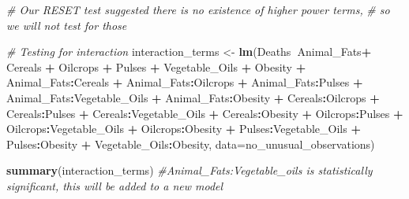 \documentclass[
]{article}
\newenvironment{Shaded}{\begin{snugshade}}{\end{snugshade}}
\newcommand{\CommentTok}[1]{\textcolor[rgb]{0.56,0.35,0.01}{\textit{#1}}}
\newcommand{\DataTypeTok}[1]{\textcolor[rgb]{0.13,0.29,0.53}{#1}}
\newcommand{\KeywordTok}[1]{\textcolor[rgb]{0.13,0.29,0.53}{\textbf{#1}}}
\newcommand{\NormalTok}[1]{#1}
\newcommand{\OperatorTok}[1]{\textcolor[rgb]{0.81,0.36,0.00}{\textbf{#1}}}
\newcommand{\StringTok}[1]{\textcolor[rgb]{0.31,0.60,0.02}{#1}}
\begin{document}
\begin{Shaded}
\begin{Highlighting}[]
\CommentTok{# Our RESET test suggested there is no existence of higher power terms,}
\CommentTok{# so we will not test for those}

\CommentTok{# Testing for interaction}
\NormalTok{interaction_terms <-}\StringTok{ }\KeywordTok{lm}\NormalTok{(Deaths}\OperatorTok{~}\NormalTok{Animal_Fats}\OperatorTok{+}\StringTok{ }\NormalTok{Cereals }\OperatorTok{+}\StringTok{ }\NormalTok{Oilcrops }\OperatorTok{+}\StringTok{ }\NormalTok{Pulses }\OperatorTok{+}\StringTok{ }
\StringTok{  }\NormalTok{Vegetable_Oils }\OperatorTok{+}\StringTok{ }\NormalTok{Obesity }\OperatorTok{+}\StringTok{ }\NormalTok{Animal_Fats}\OperatorTok{:}\NormalTok{Cereals }\OperatorTok{+}\StringTok{ }\NormalTok{Animal_Fats}\OperatorTok{:}\NormalTok{Oilcrops }\OperatorTok{+}
\StringTok{    }\NormalTok{Animal_Fats}\OperatorTok{:}\NormalTok{Pulses }\OperatorTok{+}\StringTok{ }\NormalTok{Animal_Fats}\OperatorTok{:}\NormalTok{Vegetable_Oils }\OperatorTok{+}\StringTok{ }\NormalTok{Animal_Fats}\OperatorTok{:}\NormalTok{Obesity }\OperatorTok{+}\StringTok{ }
\StringTok{    }\NormalTok{Cereals}\OperatorTok{:}\NormalTok{Oilcrops }\OperatorTok{+}\StringTok{ }\NormalTok{Cereals}\OperatorTok{:}\NormalTok{Pulses }\OperatorTok{+}\StringTok{ }
\StringTok{    }\NormalTok{Cereals}\OperatorTok{:}\NormalTok{Vegetable_Oils }\OperatorTok{+}\StringTok{ }\NormalTok{Cereals}\OperatorTok{:}\NormalTok{Obesity }\OperatorTok{+}\StringTok{ }\NormalTok{Oilcrops}\OperatorTok{:}\NormalTok{Pulses }\OperatorTok{+}\StringTok{ }
\StringTok{    }\NormalTok{Oilcrops}\OperatorTok{:}\NormalTok{Vegetable_Oils }\OperatorTok{+}\StringTok{ }\NormalTok{Oilcrops}\OperatorTok{:}\NormalTok{Obesity }\OperatorTok{+}\StringTok{ }
\StringTok{    }\NormalTok{Pulses}\OperatorTok{:}\NormalTok{Vegetable_Oils }\OperatorTok{+}\StringTok{ }\NormalTok{Pulses}\OperatorTok{:}\NormalTok{Obesity }\OperatorTok{+}\StringTok{  }\NormalTok{Vegetable_Oils}\OperatorTok{:}\NormalTok{Obesity, }
  \DataTypeTok{data=}\NormalTok{no_unusual_observations)}

\KeywordTok{summary}\NormalTok{(interaction_terms) }\CommentTok{#Animal_Fats:Vegetable_oils is statistically significant, this will be added to a new model}
\end{Highlighting}
\end{Shaded}
\end{document}
